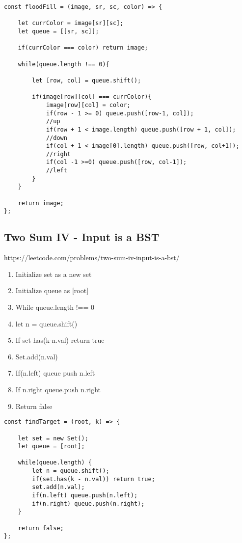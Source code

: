 \documentclass[10pt]{article}
\begin{document}
\begin{lstlisting}[title=Solution floodFill, captionpos=t]
const floodFill = (image, sr, sc, color) => {
    
    let currColor = image[sr][sc];
    let queue = [[sr, sc]];
    
    if(currColor === color) return image;
    
    while(queue.length !== 0){
        
        let [row, col] = queue.shift();
        
        if(image[row][col] === currColor){
            image[row][col] = color;
            if(row - 1 >= 0) queue.push([row-1, col]); 
            //up
            if(row + 1 < image.length) queue.push([row + 1, col]);
            //down
            if(col + 1 < image[0].length) queue.push([row, col+1]);
            //right
            if(col -1 >=0) queue.push([row, col-1]);
            //left
        }        
    }
    
    return image;
};
\end{lstlisting}

\medskip %










\pagebreak
\medskip   
\subsection {Two Sum IV - Input is a BST}
https://leetcode.com/problems/two-sum-iv-input-is-a-bst/

\begin{enumerate}
	\item Initialize set as a new set
	\item Initialize queue as [root]
	\item While queue.length !== 0
	\item let n = queue.shift()
	\item If set has(k-n.val) return true
	\item Set.add(n.val)
	\item If(n.left) queue push n.left
	\item If n.right queue.push n.right
	\item Return false
\end{enumerate}

\begin{lstlisting}[title=Solution findTarget, captionpos=t]
const findTarget = (root, k) => {
    
    let set = new Set();
    let queue = [root];
    
    while(queue.length) {
        let n = queue.shift();
        if(set.has(k - n.val)) return true;
        set.add(n.val);
        if(n.left) queue.push(n.left);
        if(n.right) queue.push(n.right);
    }
    
    return false;
};
\end{lstlisting}
\end{document}
